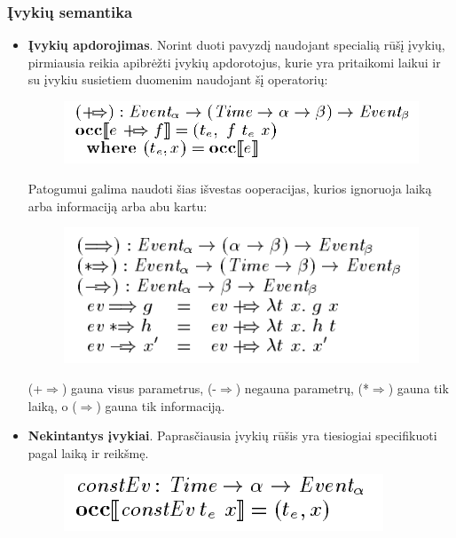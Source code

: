 \subsubsection{Įvykių semantika}

\begin{itemize}

	\item \textbf{Įvykių apdorojimas}. Norint duoti pavyzdį naudojant specialią rūšį įvykių, pirmiausia reikia apibrėžti įvykių apdorotojus, kurie yra pritaikomi laikui ir su įvykiu susietiem duomenim naudojant šį operatorių:

\begin{figure}[H]
	\centering
	\includegraphics[scale=0.75]{pics/1.png}
	\label{pic:1}
\end{figure}

	Patogumui galima naudoti šias išvestas ooperacijas, kurios ignoruoja laiką arba informaciją arba abu kartu:

\begin{figure}[H]
	\centering
	\includegraphics[scale=0.75]{pics/2.png}
	\label{pic:2}
\end{figure}

	(+$\Rightarrow$) gauna visus parametrus, (-$\Rightarrow$)  negauna parametrų, (*$\Rightarrow$) gauna tik laiką, o ($\Longrightarrow$) gauna tik informaciją.

	\item \textbf{Nekintantys įvykiai}. Paprasčiausia įvykių rūšis yra tiesiogiai specifikuoti pagal laiką ir reikšmę.

\begin{figure}[H]
	\centering
	\includegraphics[scale=0.75]{pics/3.png}
	\label{pic:3}
\end{figure}


\end{itemize}
